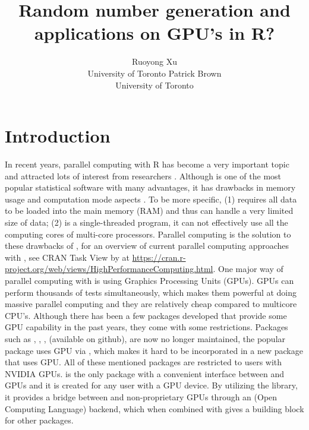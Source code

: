 \documentclass[article,nojss]{jss}\usepackage[]{graphicx}\usepackage[]{color}
\author{Ruoyong Xu\\University of Toronto
   \And Patrick Brown\\University of Toronto}
\title{Random number generation and applications on GPU’s in R?}
\begin{document}




\section[Introduction]{Introduction}

\begin{leftbar}
% 

In recent years, parallel computing with R \citep{r2021} has become a very important topic and attracted lots of interest from researchers \citep[see][for a review]{eddelbuettel2021parallel}. Although  is one of the most popular statistical software with many advantages, it has drawbacks in memory usage and computation mode aspects \citep{zhao_2016}. To be more specific, (1)  requires all data to be loaded into the main memory (RAM) and thus can handle a very limited size of data; (2)  is a single-threaded program, it can not effectively use all the computing cores of multi-core processors. Parallel computing is the solution to these drawbacks of , for an overview of current parallel computing approaches with , see CRAN Task View by \citet{cran2021} at \url{https://cran.r-project.org/web/views/HighPerformanceComputing.html}. One major way of parallel computing with  is using Graphics Processing Units (GPUs). GPUs can perform thousands of tests simultaneously, which makes them powerful at doing massive parallel computing and they are relatively cheap compared to multicore CPU's. Although there has been a few  packages developed that provide some GPU capability in the past years, they come with some restrictions. Packages such as , , ,  (available on github), are now no longer maintained, the popular  \citep{tensorflow1} package uses GPU via , which makes it hard to be incorporated in a new  package that uses GPU. All of these mentioned packages are restricted to  users with NVIDIA GPUs.  \citep{gpur1} is the only  package with a convenient interface between  and GPUs and it is created for any  user with a GPU device. By utilizing the  \citep*{rupp2016viennacl} library, it provides a bridge between  and non-proprietary GPUs through an  (Open Computing Language) backend, which when combined with  \citep{rcpp1} gives a building block for other  packages. 


\end{leftbar}
\end{document}
